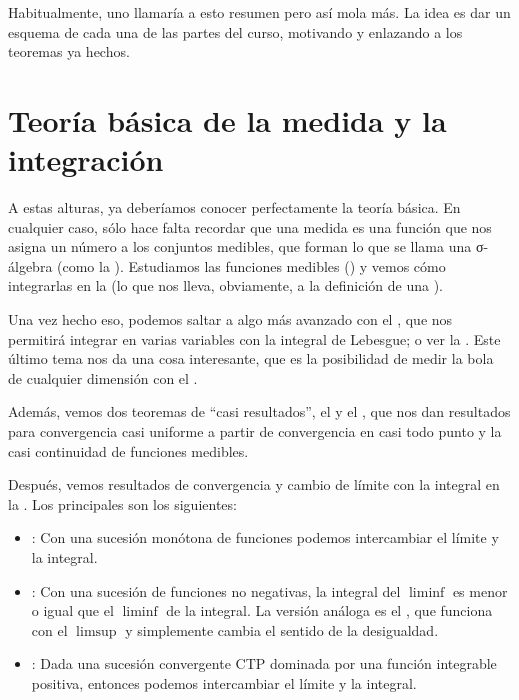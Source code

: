 Habitualmente, uno llamaría a esto resumen pero así mola más. La idea es dar un esquema de cada una de las partes del curso, motivando y enlazando a los teoremas ya hechos.

\section{Teoría básica de la medida y la integración}

A estas alturas, ya deberíamos conocer perfectamente la teoría básica. En cualquier caso, sólo hace falta recordar que una medida es una función que nos asigna un número a los conjuntos medibles, que forman lo que se llama una σ-álgebra (como la ). Estudiamos las funciones medibles () y vemos cómo integrarlas en la  (lo que nos lleva, obviamente, a la definición de una ).

Una vez hecho eso, podemos saltar a algo más avanzado con el , que nos permitirá integrar en varias variables con la integral de Lebesgue; o ver la . Este último tema nos da una cosa interesante, que es la posibilidad de medir la bola de cualquier dimensión con el .

Además, vemos dos teoremas de ``casi resultados'', el  y el , que nos dan resultados para convergencia casi uniforme a partir de convergencia en casi todo punto y la casi continuidad de funciones medibles.

Después, vemos resultados de convergencia y cambio de límite con la integral en la . Los principales son los siguientes:

\begin{itemize}
\item {}: Con una sucesión monótona de funciones podemos intercambiar el límite y la integral.
\item {}: Con una sucesión de funciones no negativas, la integral del $\liminf$ es menor o igual que el $\liminf$ de la integral. La versión análoga es el , que funciona con el $\limsup$ y simplemente cambia el sentido de la desigualdad.
\item {}: Dada una sucesión convergente CTP dominada por una función integrable positiva, entonces podemos intercambiar el límite y la integral.
\end{itemize}


